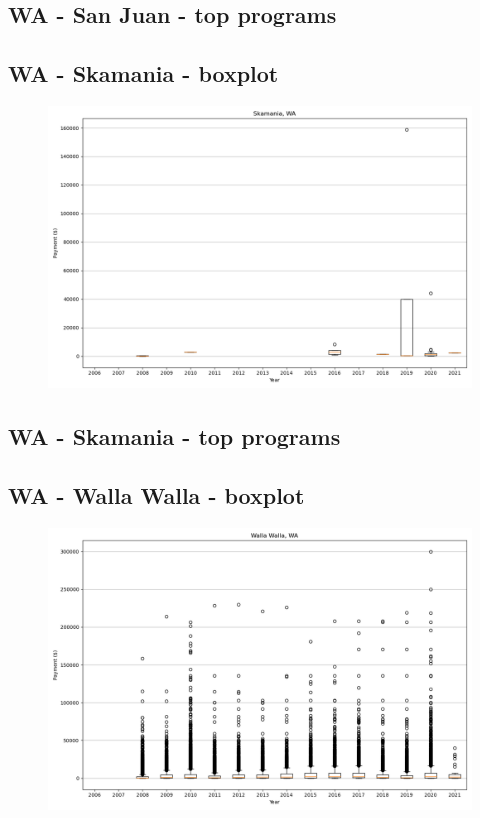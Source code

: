 \subsection*{WA - San Juan - top programs}

\newpage
\subsection*{WA - Skamania - boxplot}
\begin{figure}[h]
\centering
\includegraphics[width=7in]{../output/boxplots/counties/Skamania-WA_boxplot.png}
\end{figure}


\subsection*{WA - Skamania - top programs}

\newpage
\subsection*{WA - Walla Walla - boxplot}
\begin{figure}[h]
\centering
\includegraphics[width=7in]{../output/boxplots/counties/Walla Walla-WA_boxplot.png}
\end{figure}



